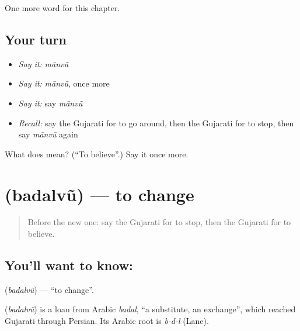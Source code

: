 \begin{grammarlens}[title={What you've built}]
One more word for this chapter.
\end{grammarlens}

\subsection*{Your turn}
\begin{itemize}
\raggedright
  \item \emph{Say it:} \emph{mānvũ}
  \item \emph{Say it:} \emph{mānvũ}, once more
  \item \emph{Say it:} say \emph{mānvũ}
  \item \emph{Recall:} say the Gujarati for to go around, then the Gujarati for to stop, then say \emph{mānvũ} again
\end{itemize}

\begin{tcolorbox}[breakable,colback=teal!4,colframe=teal!35!black,title={Before you move on}]
What does  mean? (\textquotedblleft{}To believe\textquotedblright{}.) Say it once more.
\end{tcolorbox}
\section[\texorpdfstring{\gu{બદલવું} (badalvũ)}{બદલવું (badalvũ)}]{ (badalvũ) — to change}

\label{lesson:GU-C143-badalvu}



\begin{quote}
Before the new one: say the Gujarati for to stop, then the Gujarati for to believe.
\end{quote}

\subsection*{You'll want to know: }
\textbf{} (\emph{badalvũ}) — \textquotedblleft{}to change\textquotedblright{}.

\begin{cousinweb}
\textbf{} (\emph{badalvũ}) is a loan from Arabic \emph{badal}, \textquotedblleft{}a substitute, an exchange\textquotedblright{}, which reached Gujarati through Persian. Its Arabic root is \emph{b-d-l} (Lane).
\end{cousinweb}

